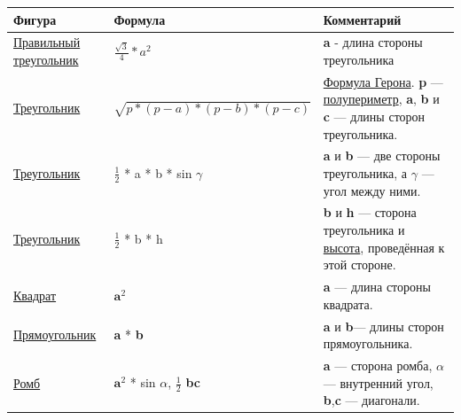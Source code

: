 \documentclass[a4paper,8pt,leqno]{article}
\theoremstyle{plain}
\theoremstyle{definition} %
\theoremstyle{remark} %
\begin{document}
\begin{table}[]
	\centering
	\label{my-label}
	\begin{tabular}{|p{4cm}|p{7cm}|p{4cm}|}
		\hline
		Фигура & Формула & Комментарий \\ \hline
		\href{https://ru.wikipedia.org/wiki/\%D0\%9F\%D1\%80\%D0\%B0\%D0\%B2\%D0\%B8\%D0\%BB\%D1\%8C\%D0\%BD\%D1\%8B\%D0\%B9\_\%D1\%82\%D1\%80\%D0\%B5\%D1\%83\%D0\%B3\%D0\%BE\%D0\%BB\%D1\%8C\%D0\%BD\%D0\%B8\%D0\%BA}{Правильный треугольник} & $\frac{\sqrt{3}}{4} * a^2 $  & \textbf{a} - длина стороны треугольника           \\ \hline
		\href{https://ru.wikipedia.org/wiki/\%D0\%A2\%D1\%80\%D0\%B5\%D1\%83\%D0\%B3\%D0\%BE\%D0\%BB\%D1\%8C\%D0\%BD\%D0\%B8\%D0\%BA}{Треугольник}     & $\sqrt{p * (p - a) * (p - b) * (p - c)}$ & \href{https://ru.wikipedia.org/wiki/\%D0\%A4\%D0\%BE\%D1\%80\%D0\%BC\%D1\%83\%D0\%BB\%D0\%B0\_\%D0\%93\%D0\%B5\%D1\%80\%D0\%BE\%D0\%BD\%D0\%B0}{Формула Герона}. \textbf{p} — \href{https://ru.wikipedia.org/wiki/\%D0\%9F\%D0\%BE\%D0\%BB\%D1\%83\%D0\%BF\%D0\%B5\%D1\%80\%D0\%B8\%D0\%BC\%D0\%B5\%D1\%82\%D1\%80}{полупериметр}, \textbf{a}, \textbf{b} и \textbf{c} — длины сторон треугольника.           \\ \hline
		\href{https://ru.wikipedia.org/wiki/\%D0\%A2\%D1\%80\%D0\%B5\%D1\%83\%D0\%B3\%D0\%BE\%D0\%BB\%D1\%8C\%D0\%BD\%D0\%B8\%D0\%BA}{Треугольник}& $\frac{1}{2}$ * a * b * sin $\gamma$       & \textbf{a} и \textbf{b} — две стороны треугольника, а $\gamma$ — угол между ними.            \\ \hline
		\href{https://ru.wikipedia.org/wiki/\%D0\%A2\%D1\%80\%D0\%B5\%D1\%83\%D0\%B3\%D0\%BE\%D0\%BB\%D1\%8C\%D0\%BD\%D0\%B8\%D0\%BA}{Треугольник}& $\frac{1}{2}$ * b * h        & \textbf{b} и \textbf{h} — сторона треугольника и \href{https://ru.wikipedia.org/wiki/\%D0\%92\%D1\%8B\%D1\%81\%D0\%BE\%D1\%82\%D0\%B0\_(\%D0\%B3\%D0\%B5\%D0\%BE\%D0\%BC\%D0\%B5\%D1\%82\%D1\%80\%D0\%B8\%D1\%8F)}{высота}, проведённая к этой стороне.            \\ \hline
	\href{https://ru.wikipedia.org/wiki/\%D0\%9A\%D0\%B2\%D0\%B0\%D0\%B4\%D1\%80\%D0\%B0\%D1\%82}{Квадрат}	& $\textbf{a}^2$ & \textbf{a} — длина стороны квадрата.            \\ \hline
	\href{https://ru.wikipedia.org/wiki/\%D0\%9F\%D1\%80\%D1\%8F\%D0\%BC\%D0\%BE\%D1\%83\%D0\%B3\%D0\%BE\%D0\%BB\%D1\%8C\%D0\%BD\%D0\%B8\%D0\%BA}{Прямоугольник} & \textbf{a} * \textbf{b} & \textbf{a} и \textbf{b}— длины сторон прямоугольника.\\ \hline
	\href{https://ru.wikipedia.org/wiki/\%D0\%A0\%D0\%BE\%D0\%BC\%D0\%B1}{Ромб}	& $\textbf{a}^2$ * sin $\alpha$, $\frac{1}{2}$ \textbf{bc} & \textbf{a} — сторона ромба, $\alpha$  — внутренний угол, \textbf{b},\textbf{c} — диагонали.            \\ \hline

\end{tabular}
\end{table}
\end{document}
